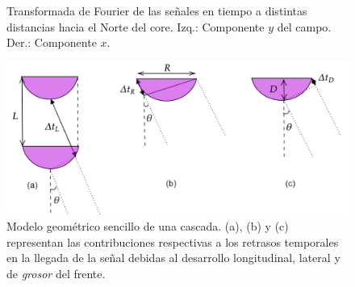 \documentclass[11 pt, a4paper]{article} %
\numberwithin{equation}{section}
\numberwithin{figure}{section}
\numberwithin{table}{section}
\begin{document}
\begin{figure}[H]
	\centering
	\caption{Transformada de Fourier de las señales en tiempo a distintas distancias hacia el Norte del core. Izq.: Componente $y$ del campo. Der.: Componente $x$.}
	\label{E_fields_FFT}
\end{figure}
\begin{figure}[H]
	\centering
	\includegraphics[width=.75\linewidth]{figures/radio/coherence_v2}
	\caption{Modelo geométrico sencillo de una cascada. (a), (b) y (c) representan las contribuciones respectivas a los retrasos temporales en la llegada de la señal debidas al desarrollo longitudinal, lateral y de \textit{grosor} del frente.}
	\label{coherence}
\end{figure}
\end{document}

